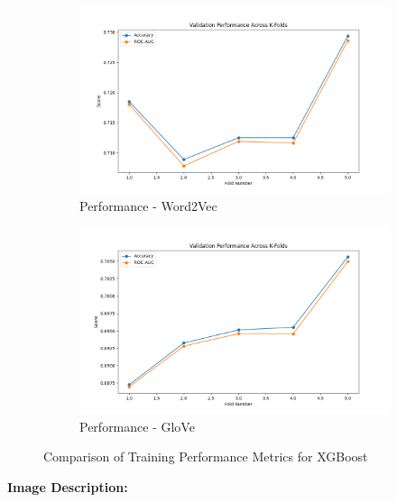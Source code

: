\begin{figure}[H]
    \begin{subfigure}[b]{0.48\textwidth}
        \includegraphics[width=\textwidth]{img/report_info/img/1.3.XGB/best_xgboost_word2vec.png}
        \caption{Performance - Word2Vec}
        \label{fig:lr-word2vec}
    \end{subfigure}
    \begin{subfigure}[b]{0.48\textwidth}
        \includegraphics[width=\textwidth]{img/report_info/img/1.3.XGB/best_xgboost_glove.png}
        \caption{Performance - GloVe}
        \label{fig:lr-glove}
    \end{subfigure}
    
    \caption{Comparison of Training Performance Metrics for XGBoost}
    \label{fig:lr-performance-group}
\end{figure}

\textbf{Image Description:}

